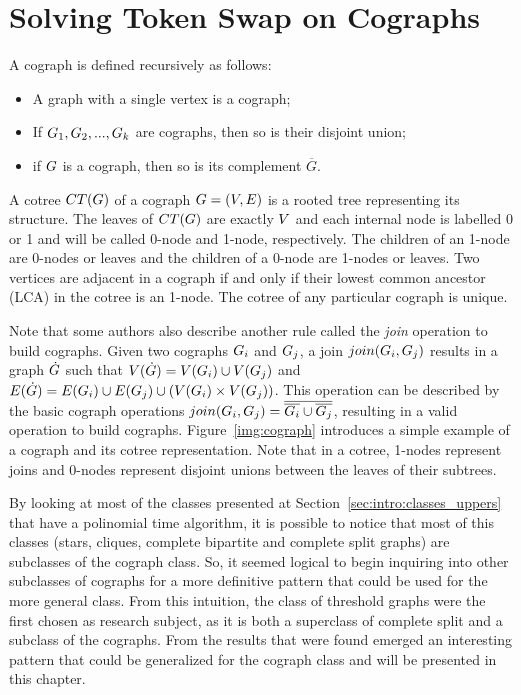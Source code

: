 \documentclass[msc,english,table,xcdraw]{ppgccufmg}
\begin{document}
\chapter{Solving Token Swap on Cographs}
\label{chp:cographs}

A cograph is defined recursively as follows:

\begin{itemize}
    \item A graph with a single vertex is a cograph;
    \item If $G_{1}, G_{2}, ... ,G_{k}$ are cographs, then 
    so is their disjoint union;
    \item if $G$ is a cograph, then so is its complement $\overline{G}$.
\end{itemize}

A cotree $CT(G)$ of a cograph $G = (V,E)$ is a rooted 
tree representing its structure. 
The leaves of $CT(G)$ are exactly $V$ and each internal 
node is labelled 0 or 1 and will be called 0-node and 1-node, respectively.
The children of an 1-node are 0-nodes or leaves and the children of a 0-node 
are 1-nodes or leaves. 
Two vertices are adjacent in a cograph if and only if their lowest common 
ancestor (LCA) in the cotree is an 1-node.
The cotree of any particular cograph is unique.

Note that some authors also describe another rule called the \textit{join} 
operation to build cographs.
Given two cographs $G_{i}$ and $G_{j}$, a join $join(G_{i},
G_{j})$ results in a graph $\dot{G}$ such that $V(\dot{G}) = V(G_{i}) \cup V(G_{j})$ and 
$E(\dot{G}) = E(G_{i}) \cup E(G_{j})
\cup ( V(G_{i}) \times V(G_{j}) )$.
This operation can be described by the basic cograph operations $join(G_{i},
G_{j}) = \overline{\overline{G_{i}} \cup \overline{G_{j}}}$, resulting 
in a valid operation to build cographs.
Figure~\ref{img:cograph} introduces a simple example of a cograph and its cotree
representation.
Note that in a cotree, 1-nodes represent joins and 0-nodes represent disjoint 
unions between the leaves of their subtrees.

By looking at most of the classes presented at Section~\ref{sec:intro:classes_uppers} 
that have a polinomial time algorithm, it is possible to notice that most of this classes 
(stars, cliques, complete bipartite and complete split graphs) are subclasses 
of the cograph class.
So, it seemed logical to begin inquiring into other subclasses of cographs for a more
definitive pattern that could be used for the more general class.
From this intuition, the class of threshold graphs were the first chosen as research
subject, as it is both a superclass of complete split and a subclass of the cographs.
From the results that were found emerged an interesting pattern that could be generalized
for the cograph class and will be presented in this chapter.
\end{document}
